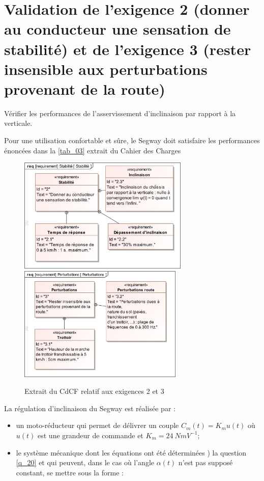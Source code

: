 \documentclass[10pt,fleqn]{article} %
\begin{document}
\section{Validation de  l'exigence 2 (donner au conducteur une sensation de stabilité) et de l'exigence 3 (rester insensible aux perturbations provenant de la route)}

\begin{obj}
Vérifier les performances de l’asservissement d’inclinaison par rapport à la verticale.
\end{obj}

\ifprof
\else

Pour une utilisation confortable et sûre, le Segway doit satisfaire les performances énoncées dans la \autoref{tab_03} extrait du Cahier des Charges


\begin{figure}[H]
\centering
\includegraphics[height=5.5cm]{req_02}
\hfill
\includegraphics[height=5.5cm]{req_03}
\caption{Extrait du CdCF relatif aux exigences 2 et 3 \label{tab_03} }
\end{figure}


La régulation d’inclinaison du Segway est réalisée par :
\begin{itemize}
\item un moto-réducteur qui permet de délivrer un couple $C_m(t)=K_m u(t)$ où $u(t)$ est une grandeur de commande et  $K_m = \SI{24}{NmV^{-1}}$;
\item le système mécanique dont les équations ont été déterminées ) la question \ref{q_20} et qui peuvent, dans le cas où l’angle $\alpha(t)$ n’est pas supposé constant, se mettre sous la forme :
\end{itemize}
\end{document}
